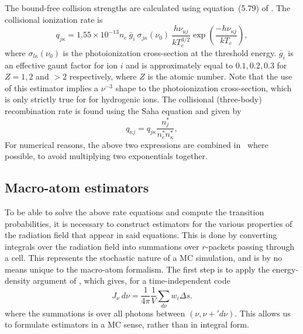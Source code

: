 The bound-free collision strengths are calculated using equation~(5.79) of
\cite{mihalas}. The collisional ionization rate is
\begin{equation}
q_{j\kappa} = 1.55 \times 10^{-13} n_e~\bar{g}_{i}~\sigma_{j\kappa} (\nu_0)~
\frac{h \nu_{uj}}{k T_e^{3/2}}
\exp \left( \frac{- h \nu_{\kappa j}}{k T_e} \right),
\label{eq:vanregemorterw}
\end{equation}
where $\sigma_{l\kappa} (\nu_0)$ is the photoionization cross-section 
at the threshold energy.
$\bar{g}_{i}$ is an effective gaunt factor for ion $i$ and is approximately
equal to $0.1,0.2,0.3$ for $Z=1,2$ and $>2$ respectively,
where $Z$ is the atomic number. Note that the use of this estimator
implies a $\nu^{-3}$ shape to the photoionization cross-section,
which is only strictly true for for hydrogenic ions.
The collisional (three-body) recombination rate is found using the Saha equation
and given by
\begin{equation}
q_{\kappa j} = q_{j\kappa} \frac{n_j^*}{n_e^* n_\kappa^*},
\label{eq:vanregemorterw}
\end{equation}
For numerical reasons, the above two expressions are combined in \py\ where 
possible, to avoid multiplying two exponentials together.





\subsection{Macro-atom estimators}
\label{sec:estimators}
To be able to solve the above rate equations and compute the transition 
probabilities, it is necessary to construct estimators for the various properties
of the radiation field that appear in said equations. This is done
by converting integrals over the radiation field into summations over 
$r$-packets passing through a cell. This represents the stochastic nature of
a MC simulation, and is by no means unique to the macro-atom formalism.
The first step is to apply the energy-density argument of \cite{lucy1999radeq},
which gives, for a time-independent code
\begin{equation}
J_\nu~d\nu = \frac{1}{4\pi}\frac{1}{V} \sum_{d\nu} w_i \Delta s.
\end{equation}
where the summations is over all photons between $(\nu, \nu+'d\nu)$. This allows
us to formulate estimators in a MC sense, rather than in integral form. 

